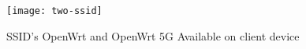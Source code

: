 %	
%	
%	
%	
%	
%	
%	
%
%	
  \begin{figure}[H]
	\centering
	\texttt{[image: two-ssid]}
	\caption {SSID's OpenWrt and OpenWrt 5G Available on client device}
	\label{fig:two-ssid}
	\vspace{-10pt}
\end{figure}
